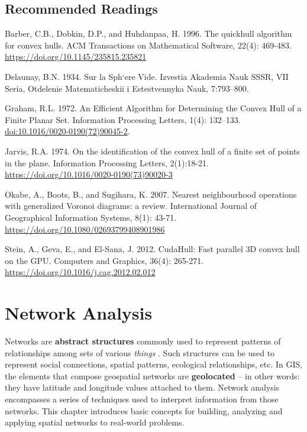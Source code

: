 \documentclass[
]{book}
\begin{document}
\hypertarget{recommended-readings-3}{%
\section*{Recommended Readings}\label{recommended-readings-3}}

Barber, C.B., Dobkin, D.P., and Huhdanpaa, H. 1996. The quickhull algorithm for convex hulls. ACM Transactions on Mathematical Software, 22(4): 469-483. \url{https://doi.org/10.1145/235815.235821}

Delaunay, B.N. 1934. Sur la Sph`ere Vide. Izvestia Akademia Nauk SSSR, VII Seria, Otdelenie
Matematicheskii i Estestvennyka Nauk, 7:793--800.

Graham, R.L. 1972. An Efficient Algorithm for Determining the Convex Hull of a Finite Planar Set. Information Processing Letters, 1(4): 132--133. \url{doi:10.1016/0020-0190(72)90045-2}.

Jarvis, R.A. 1974. On the identification of the convex hull of a finite set of points in the plane. Information Processing Letters, 2(1):18-21. \url{https://doi.org/10.1016/0020-0190(73)90020-3}

Okabe, A., Boots, B., and Sugihara, K. 2007. Nearest neighbourhood operations with generalized Voronoi diagrams: a review. International Journal of Geographical Information Systems, 8(1): 43-71. \url{https://doi.org/10.1080/02693799408901986}

Stein, A., Geva, E., and El-Sana, J. 2012. CudaHull: Fast parallel 3D convex hull on the GPU. Computers and Graphics, 36(4): 265-271. \url{https://doi.org/10.1016/j.cag.2012.02.012}

\hypertarget{network-analysis}{%
\chapter{Network Analysis}\label{network-analysis}}

Networks are \textbf{abstract structures} commonly used to represent patterns of relationships among sets of various \emph{things} \citep{ajorlouIntroductionNetworkModels2018}. Such structures can be used to represent social connections, spatial patterns, ecological relationships, etc. In GIS, the elements that compose geospatial networks are \textbf{geolocated} -- in other words: they have latitude and longitude values attached to them. Network analysis encompasses a series of techniques used to interpret information from those networks. This chapter introduces basic concepts for building, analyzing and applying spatial networks to real-world problems.
\end{document}
